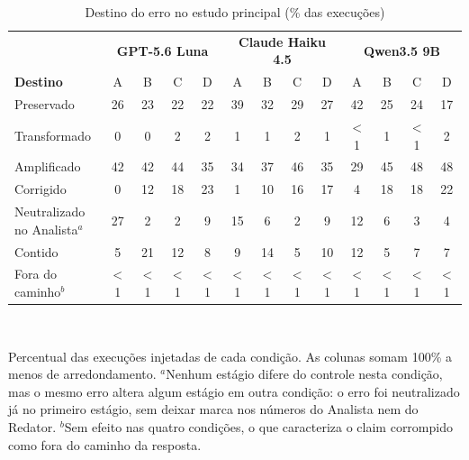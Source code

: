 \begin{table}[t]
\caption{Destino do erro no estudo principal (\% das execuções)}
\label{tab:destino}
\centering
\footnotesize
\setlength{\tabcolsep}{3.2pt}
\begin{tabular}{|l|cccc|cccc|cccc|}
\hline
 & \multicolumn{4}{c|}{\textbf{GPT-5.6 Luna}} & \multicolumn{4}{c|}{\textbf{Claude Haiku 4.5}} & \multicolumn{4}{c|}{\textbf{Qwen3.5 9B}} \\
\textbf{Destino} & A & B & C & D & A & B & C & D & A & B & C & D \\
\hline
Preservado & 26 & 23 & 22 & 22 & 39 & 32 & 29 & 27 & 42 & 25 & 24 & 17 \\
Transformado & 0 & 0 & 2 & 2 & 1 & 1 & 2 & 1 & $<$1 & 1 & $<$1 & 2 \\
Amplificado & 42 & 42 & 44 & 35 & 34 & 37 & 46 & 35 & 29 & 45 & 48 & 48 \\
Corrigido & 0 & 12 & 18 & 23 & 1 & 10 & 16 & 17 & 4 & 18 & 18 & 22 \\
Neutralizado no Analista$^{a}$ & 27 & 2 & 2 & 9 & 15 & 6 & 2 & 9 & 12 & 6 & 3 & 4 \\
Contido & 5 & 21 & 12 & 8 & 9 & 14 & 5 & 10 & 12 & 5 & 7 & 7 \\
Fora do caminho$^{b}$ & $<$1 & $<$1 & $<$1 & $<$1 & $<$1 & $<$1 & $<$1 & $<$1 & $<$1 & $<$1 & $<$1 & $<$1 \\
\hline
\end{tabular}
\\[2pt]{\scriptsize\raggedright Percentual das execuções injetadas de cada condição. As colunas somam 100\% a menos de arredondamento. $^{a}$Nenhum estágio difere do controle nesta condição, mas o mesmo erro altera algum estágio em outra condição: o erro foi neutralizado já no primeiro estágio, sem deixar marca nos números do Analista nem do Redator. $^{b}$Sem efeito nas quatro condições, o que caracteriza o claim corrompido como fora do caminho da resposta.\par}
\end{table}
